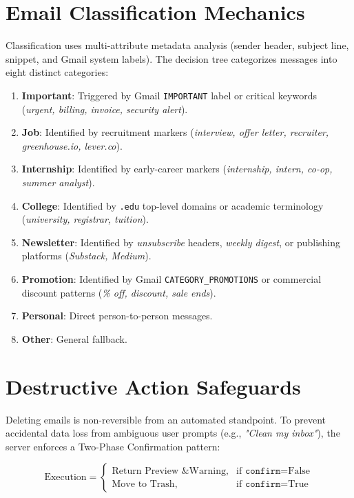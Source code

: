 \documentclass[11pt,a4paper]{article}
\begin{document}
\section{Email Classification Mechanics}
Classification uses multi-attribute metadata analysis (sender header, subject line, snippet, and Gmail system labels). The decision tree categorizes messages into eight distinct categories:
\begin{enumerate}
    \item \textbf{Important}: Triggered by Gmail \texttt{IMPORTANT} label or critical keywords (\textit{urgent, billing, invoice, security alert}).
    \item \textbf{Job}: Identified by recruitment markers (\textit{interview, offer letter, recruiter, greenhouse.io, lever.co}).
    \item \textbf{Internship}: Identified by early-career markers (\textit{internship, intern, co-op, summer analyst}).
    \item \textbf{College}: Identified by \texttt{.edu} top-level domains or academic terminology (\textit{university, registrar, tuition}).
    \item \textbf{Newsletter}: Identified by \textit{unsubscribe} headers, \textit{weekly digest}, or publishing platforms (\textit{Substack, Medium}).
    \item \textbf{Promotion}: Identified by Gmail \texttt{CATEGORY\_PROMOTIONS} or commercial discount patterns (\textit{\% off, discount, sale ends}).
    \item \textbf{Personal}: Direct person-to-person messages.
    \item \textbf{Other}: General fallback.
\end{enumerate}

\section{Destructive Action Safeguards}
Deleting emails is non-reversible from an automated standpoint. To prevent accidental data loss from ambiguous user prompts (e.g., \textit{"Clean my inbox"}), the server enforces a Two-Phase Confirmation pattern:

\begin{equation}
\text{Execution} = \begin{cases} 
\text{Return Preview \& Warning}, & \text{if } \texttt{confirm} = \text{False} \\
\text{Move to Trash}, & \text{if } \texttt{confirm} = \text{True}
\end{cases}
\end{equation}
\end{document}
